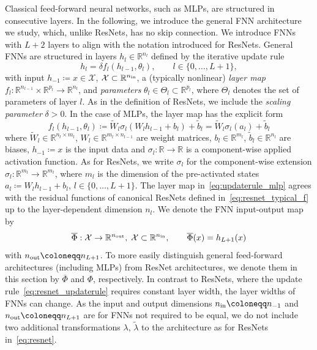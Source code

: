 \documentclass[10pt]{article}
\theoremstyle{definition}
\numberwithin{equation}{section}
\newcommand{\R}{\mathbb{R}}
\newcommand*{\nout}{n_\textup{out}}
\newcommand*{\nin}{n_\textup{in}}
\begin{document}
Classical feed-forward neural networks, such as MLPs, are structured in consecutive layers. In the following, we introduce the general FNN architecture we study, which, unlike ResNets, has no skip connection. We introduce FNNs with $L+2$ layers to align with the notation introduced for ResNets.
General FNNs are structured in layers $h_l \in \R^{n_l}$ defined by the iterative update rule
\begin{equation}
    h_l = \delta f_l(h_{l-1},\theta_l), \qquad l \in \{0,\ldots,L+1\},
\end{equation}
with input $h_{-1} \coloneqq x \in \mathcal{X}$, $\mathcal{X} \subset \R^{\nin}$, a (typically nonlinear) \emph{layer map} $f_l:\R^{n_{l-1}} \times \R^{p_{l}} \rightarrow \R^{n_l}$, and \emph{parameters} $\theta_{l} \in \Theta_l \subset \R^{p_{l}}$, where $ \Theta_l$ denotes the set of parameters of layer $l$. As in the definition of ResNets, we include the \emph{scaling parameter} $\delta>0$. In the case of MLPs, the layer map has the explicit form
\begin{equation} \label{eq:updaterule_mlp} 
	f_l(h_{l-1},\theta_{l}) \coloneqq \widetilde{W}_l\sigma_l(W_lh_{l-1}+b_l)+\tilde{b}_l = \widetilde{W}_l\sigma_l(a_l)+\tilde{b}_l
\end{equation}
where $\widetilde{W}_l \in \R^{n_{l} \times m_l}$, $W_l \in \R^{m_{l}\times n_{l-1}}$ are weight matrices, $b_l \in \R^{m_{l}}$, $\tilde{b}_l \in \R^{n_{l}}$ are biases, $h_{-1} \coloneqq x$ is the input data and $\sigma_l: \R\rightarrow \R$ is a component-wise applied activation function. As for ResNets, we write $\sigma_l$ for the component-wise extension $\sigma_l: \R^{m_{l}}\rightarrow \R^{m_{l}}$, where $m_l$ is the dimension of the pre-activated states $a_l \coloneqq W_l h_{l-1}+b_l$, $l \in \{0,\ldots,L+1\}$. The layer map in~\eqref{eq:updaterule_mlp} agrees with the residual functions of canonical ResNets defined in~\eqref{eq:resnet_typical_f} up to the layer-dependent dimension $n_l$. We denote the FNN input-output map by 
\begin{equation} \label{eq:mlp}
	\overline{\Phi}: \mathcal{X} \rightarrow \R^{\nout}, \; \mathcal{X} \subset \R^{\nin}, \qquad \overline{\Phi}(x) = h_{L+1}(x)
\end{equation}
with $\nout \coloneqq n_{L+1}$. To more easily distinguish general feed-forward architectures (including MLPs) from ResNet architectures, we denote them in this section by $\overline{\Phi}$ and $\Phi$, respectively. In contrast to ResNets, where the update rule~\eqref{eq:resnet_updaterule} requires constant layer width, the layer widths of FNNs can change. As the input and output dimensions $\nin \coloneqq n_{-1}$ and $\nout \coloneqq n_{L+1}$ are for FNNs not required to be equal, we do not include two additional transformations $\lambda$, $\tilde{\lambda}$ to the architecture as for ResNets in~\eqref{eq:resnet}. 
\end{document}
